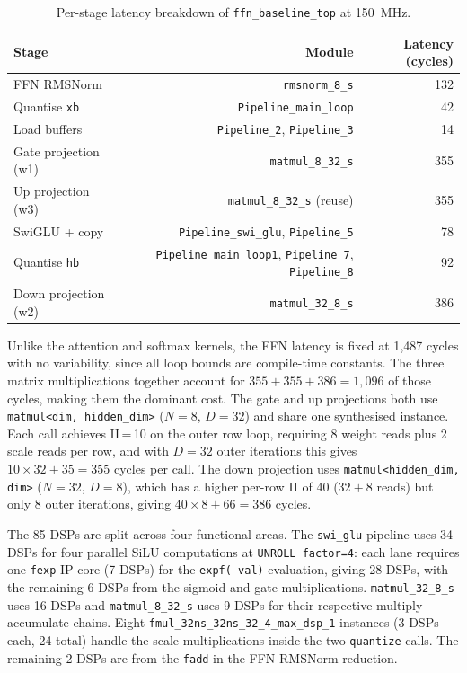 \begin{table}[H]
  \centering
  \begin{tabular}{lrr}
    \toprule
    Stage & Module & Latency (cycles) \\
    \midrule
    FFN RMSNorm           & \texttt{rmsnorm\_8\_s}           & 132 \\
    Quantise \texttt{xb}  & \texttt{Pipeline\_main\_loop}    &  42 \\
    Load buffers          & \texttt{Pipeline\_2}, \texttt{Pipeline\_3} & 14 \\
    Gate projection (w1)  & \texttt{matmul\_8\_32\_s}        & 355 \\
    Up projection (w3)    & \texttt{matmul\_8\_32\_s} (reuse) & 355 \\
    SwiGLU + copy         & \texttt{Pipeline\_swi\_glu}, \texttt{Pipeline\_5} & 78 \\
    Quantise \texttt{hb}  & \texttt{Pipeline\_main\_loop1}, \texttt{Pipeline\_7}, \texttt{Pipeline\_8} & 92 \\
    Down projection (w2)  & \texttt{matmul\_32\_8\_s}        & 386 \\
    \bottomrule
  \end{tabular}
  \caption{Per-stage latency breakdown of \texttt{ffn\_baseline\_top}
           at \SI{150}{\mega\hertz}.}
  \label{tab:ffn_latency}
\end{table}

Unlike the attention and softmax kernels, the FFN latency is fixed at
1{,}487 cycles with no variability, since all loop bounds are compile-time
constants. The three matrix multiplications together account for $355 +
355 + 386 = 1{,}096$ of those cycles, making them the dominant cost.
The gate and up projections both use \texttt{matmul<dim, hidden\_dim>}
($N = 8$, $D = 32$) and share one synthesised instance. Each call
achieves II\,=\,10 on the outer row loop, requiring 8 weight reads plus 2 scale
reads per row, and with $D = 32$ outer iterations this gives
$10 \times 32 + 35 = 355$ cycles per call. The down projection uses
\texttt{matmul<hidden\_dim, dim>} ($N = 32$, $D = 8$), which has a
higher per-row II of 40 ($32 + 8$ reads) but only 8 outer iterations,
giving $40 \times 8 + 66 = 386$ cycles.

The 85 DSPs are split across four functional areas. The \texttt{swi\_glu}
pipeline uses 34 DSPs for four parallel SiLU computations at
\texttt{UNROLL factor=4}: each lane requires one \texttt{fexp} IP core
(7 DSPs) for the \texttt{expf(-val)} evaluation, giving 28 DSPs, with
the remaining 6 DSPs from the sigmoid and gate multiplications.
\texttt{matmul\_32\_8\_s} uses 16 DSPs and \texttt{matmul\_8\_32\_s} uses
9 DSPs for their respective multiply-accumulate chains. Eight
\texttt{fmul\_32ns\_32ns\_32\_4\_max\_dsp\_1} instances (3 DSPs each, 24
total) handle the scale multiplications inside the two \texttt{quantize}
calls. The remaining 2 DSPs are from the \texttt{fadd} in the FFN
RMSNorm reduction.

